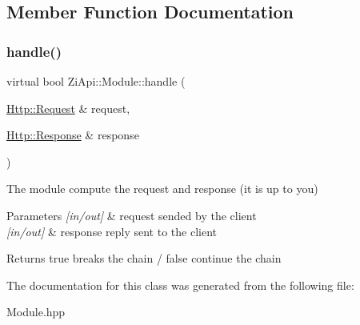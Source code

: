 \subsection{Member Function Documentation}
\mbox{\label{classZiApi_1_1Module_a36a4a400a44f883262123e7a0ec2778f}} 
\subsubsection{\texorpdfstring{handle()}{handle()}}
{\footnotesize\ttfamily virtual bool Zi\+Api\+::\+Module\+::handle (\begin{DoxyParamCaption}\item[{\mbox{\hyperlink{classHttp_1_1Request}{Http\+::\+Request}} \&}]{request,  }\item[{\mbox{\hyperlink{classHttp_1_1Response}{Http\+::\+Response}} \&}]{response }\end{DoxyParamCaption})\hspace{0.3cm}{\ttfamily [pure virtual]}}



The module compute the request and response (it is up to you) 


\begin{DoxyParams}{Parameters}
{\em \mbox{[}in/out\mbox{]}} & request sended by the client \\
\hline
{\em \mbox{[}in/out\mbox{]}} & response reply sent to the client \\
\hline
\end{DoxyParams}
\begin{DoxyReturn}{Returns}
true breaks the chain / false continue the chain 
\end{DoxyReturn}


The documentation for this class was generated from the following file\+:\begin{DoxyCompactItemize}
\item 
Module.\+hpp\end{DoxyCompactItemize}
